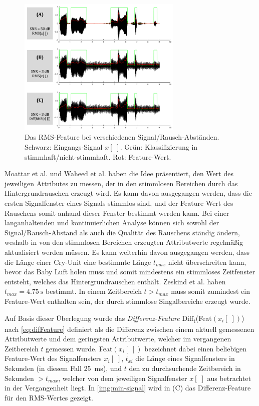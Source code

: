 \begin{figure}[h]
	\centering
	\includegraphics[width=0.7\textwidth]{bilder/rms_diff.png}
	\caption[Das RMS-Feature bei verschiedenen Signal/Rausch-Abständen]{Das RMS-Feature bei verschiedenen Signal/Rausch-Abständen. Schwarz: Eingangs-Signal $x[\;]$. Grün: Klassifizierung in stimmhaft/nicht-stimmhaft. Rot: Feature-Wert.}
	\label{img:min-signal}
\end{figure}

Moattar et al. \cite{vad_Easy} und Waheed et al. \cite{vad_entropy} haben die Idee präsentiert, den Wert des jeweiligen Attributes zu messen, der in den stimmlosen Bereichen durch das Hintergrundrauschen erzeugt wird. Es kann davon ausgegangen werden, dass die ersten Signalfenster eines Signals stimmlos sind, und der Feature-Wert des Rauschens somit anhand dieser Fenster bestimmt werden kann. Bei einer langanhaltenden und kontinuierlichen Analyse können sich sowohl der Signal/Rausch-Abstand als auch die Qualität des Rauschens ständig ändern, weshalb in von den stimmlosen Bereichen erzeugten Attributwerte regelmäßig aktualisiert werden müssen. Es kann weiterhin davon ausgegangen werden, dass die Länge einer Cry-Unit eine bestimmte Länge $t_{max}$ nicht überschreiten kann, bevor das Baby Luft holen muss und somit mindestens ein stimmloses Zeitfenster entsteht, welches das Hintergrundrauschen enthält. Zeskind et al. \cite[S. 325]{rythmic} haben $t_{max} = \SI{4.75}{\second}$ bestimmt. In einem Zeitbereich $ t > t_{max}$ muss somit zumindest ein Feature-Wert enthalten sein, der durch stimmlose Singalbereiche erzeugt wurde. 

Auf Basis dieser Überlegung wurde das \emph{Differenz-Feature} Diff\textsubscript{t}(Feat$(x_i[\;])$) nach \autoref{eq:difFeature} definiert als die Differenz zwischen einem aktuell gemessenen Attributwerte und dem geringsten Attributwerte, welcher im vergangenen Zeitbereich $t$ gemessen wurde. Feat$(x_i[\;])$ bezeichnet dabei einen beliebigen Feature-Wert des Signalfensters $x_i[\;]$, $t_{xi}$ die Länge eines Signalfensters in Sekunden (in diesem Fall \SI{25}{\milli\second}), und $t$ den zu durchsuchende Zeitbereich in Sekunden $> t_{max}$, welcher von dem jeweiligen Signalfenster $x[\;]$ aus betrachtet in der Vergangenheit liegt. In \autoref{img:min-signal} wird in (C) das Differenz-Feature für den RMS-Wertes gezeigt.

